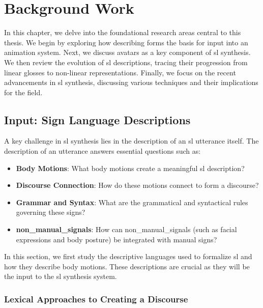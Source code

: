 \documentclass[../../main.tex]{subfiles}
\begin{document}
\chapter{Background Work}
\label{ch:background_work}

In this chapter, we delve into the foundational research areas central to this thesis. We begin by exploring how describing forms the basis for input into an animation system. Next, we discuss avatars as a key component of \gls{sl} synthesis. We then review the evolution of \gls{sl} descriptions, tracing their progression from linear \gls{glosses} to non-linear representations. Finally, we focus on the recent advancements in \gls{sl} synthesis, discussing various techniques and their implications for the field.

\section{Input: Sign Language Descriptions}
\label{ch:background_work:sign_language_descriptions}

A key challenge in \gls{sl} synthesis lies in the description of an \gls{sl} \gls{utterance} itself. The description of an \gls{utterance} answers essential questions such as:

\begin{itemize}
  \item \textbf{Body Motions}: What body motions create a meaningful \gls{sl} description?
  \item \textbf{Discourse Connection}: How do these motions connect to form a discourse?
  \item \textbf{Grammar and Syntax}: What are the grammatical and syntactical rules governing these signs?
  \item \textbf{\gls{non_manual_signals}}: How can \gls{non_manual_signals} (such as facial expressions and body posture) be integrated with manual signs?
\end{itemize}

In this section, we first study the descriptive languages used to formalize \gls{sl} and how they describe body motions. These descriptions are crucial as they will be the input to the \gls{sl} synthesis system.

\subsection{Lexical Approaches to Creating a Discourse}
\label{ch:background_work:sign_language_descriptions:lexical_approaches}
\end{document}
